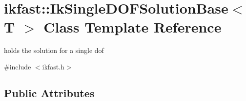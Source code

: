 \hypertarget{classikfast_1_1IkSingleDOFSolutionBase}{\section{ikfast\-:\-:Ik\-Single\-D\-O\-F\-Solution\-Base$<$ T $>$ Class Template Reference}
\label{classikfast_1_1IkSingleDOFSolutionBase}
}


holds the solution for a single dof  




{\ttfamily \#include $<$ikfast.\-h$>$}

\subsection*{Public Attributes}
